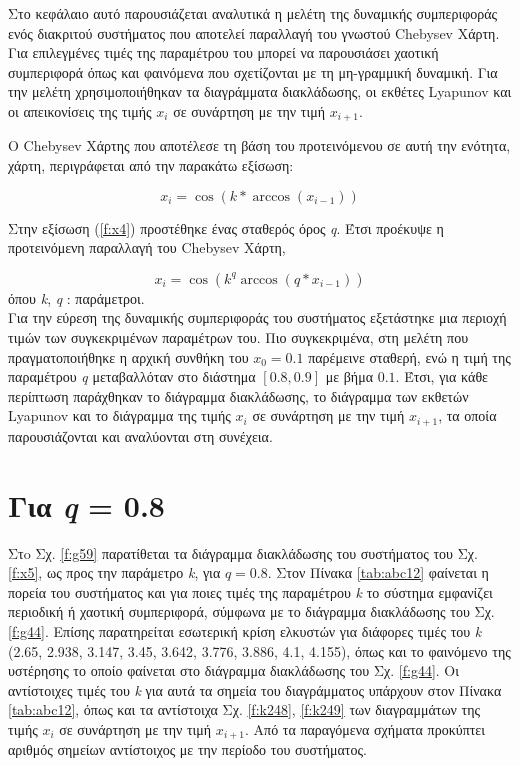 Στο κεφάλαιο αυτό παρουσιάζεται αναλυτικά η μελέτη της δυναμικής συμπεριφοράς ενός διακριτού συστήματος που αποτελεί παραλλαγή του γνωστού Chebysev Χάρτη. Για επιλεγμένες τιμές της παραμέτρου του μπορεί να παρουσιάσει χαοτική συμπεριφορά όπως και φαινόμενα που σχετίζονται με τη μη-γραμμική δυναμική. Για την μελέτη χρησιμοποιήθηκαν τα διαγράμματα διακλάδωσης, οι εκθέτες Lyapunov και οι απεικονίσεις της τιμής \(x_i\) σε συνάρτηση με  την τιμή \(x_{i+1}\).

Ο Chebysev Χάρτης που αποτέλεσε τη βάση του προτεινόμενου σε αυτή την ενότητα, χάρτη, περιγράφεται από την παρακάτω εξίσωση:

\begin{equation}
	x_i=\cos(k*\arccos(x_{i-1}))
	\label{f:x4}
\end{equation}


Στην εξίσωση (\ref{f:x4}) προστέθηκε ένας σταθερός όρος \emph{q}. Έτσι προέκυψε η προτεινόμενη παραλλαγή του Chebysev Χάρτη,

\begin{equation}
	x_i=\cos(k^q\arccos(q*x_{i-1}))
	\label{f:x5}
\end{equation}
όπου \emph{k}, \emph{q} : παράμετροι.\\

Για την εύρεση της δυναμικής συμπεριφοράς του συστήματος εξετάστηκε μια περιοχή τιμών των συγκεκριμένων παραμέτρων του. Πιο συγκεκριμένα, στη μελέτη που πραγματοποιήθηκε η αρχική συνθήκη του $x_0 =0.1$ παρέμεινε  σταθερή, ενώ η τιμή της παραμέτρου \emph{q} μεταβαλλόταν στο διάστημα $[0.8,0.9]$ με βήμα $0.1$. Έτσι, για κάθε περίπτωση παράχθηκαν το διάγραμμα διακλάδωσης, το διάγραμμα των εκθετών Lyapunov και το διάγραμμα της τιμής \(x_i\) σε συνάρτηση με  την τιμή \(x_{i+1}\), τα οποία παρουσιάζονται και αναλύονται στη συνέχεια.\\

\vspace{\fill}


\section{Για \emph{q} = 0.8}

Στo Σχ. \ref{f:g59} παρατίθεται τα διάγραμμα διακλάδωσης του συστήματος του Σχ. \ref{f:x5}, ως προς την παράμετρο \emph{k}, για $q =0.8$. Στον Πίνακα \ref{tab:abc12} φαίνεται η πορεία του συστήματος και για ποιες τιμές της παραμέτρου \emph{k} το σύστημα εμφανίζει περιοδική ή χαοτική συμπεριφορά, σύμφωνα με το διάγραμμα διακλάδωσης του Σχ. \ref{f:g44}. Επίσης παρατηρείται εσωτερική κρίση ελκυστών για διάφορες τιμές του \emph{k} (2.65, 2.938, 3.147, 3.45, 3.642, 3.776, 3.886, 4.1, 4.155), όπως και το φαινόμενο της υστέρησης το οποίο φαίνεται στο διάγραμμα διακλάδωσης του Σχ. \ref{f:g44}. Οι αντίστοιχες τιμές του \emph{k} για αυτά τα σημεία του διαγράμματος υπάρχουν στον Πίνακα \ref{tab:abc12}, όπως και τα αντίστοιχα Σχ. \ref{f:k248}, \ref{f:k249} των διαγραμμάτων της τιμής \(x_i\) σε συνάρτηση με την τιμή \(x_{i+1}\). Από τα παραγόμενα σχήματα προκύπτει αριθμός σημείων αντίστοιχος με την περίοδο του συστήματος.

